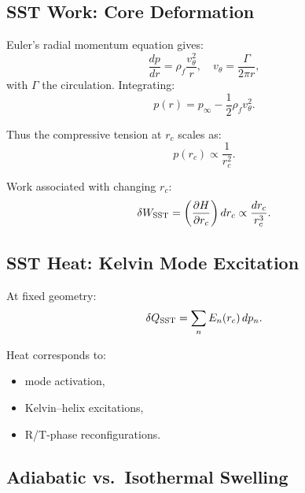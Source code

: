 \documentclass[11pt]{article}
\newcommand{\rhof}{\rho_{\!f}} \newcommand{\rhoF}{\rho_{\!f}}                             %
\newcommand{\rc}{r_c}                                    %
\begin{document}
        \subsection{SST Work: Core Deformation}

            Euler’s radial momentum equation gives:
            \begin{equation}
                \frac{dp}{dr} = \rhof \frac{v_\theta^2}{r},
                \quad
                v_\theta = \frac{\Gamma}{2\pi r},
            \end{equation}
            with $\Gamma$ the circulation.
            Integrating:
            \begin{equation}
                p(r) = p_\infty - \frac12 \rhof v_\theta^2.
            \end{equation}

            Thus the compressive tension at $\rc$ scales as:
            \begin{equation}
                p(\rc) \propto \frac{1}{\rc^2}.
            \end{equation}

            Work associated with changing $\rc$:
            \begin{equation}
                \delta W_{\rm SST} = \left( \frac{\partial H}{\partial \rc} \right) d\rc
                \propto \frac{d\rc}{\rc^3}.
            \end{equation}

        \subsection{SST Heat: Kelvin Mode Excitation}

            At fixed geometry:
            \begin{equation}
                \delta Q_{\rm SST} = \sum_n E_n(\rc)\, dp_n.
            \end{equation}

            Heat corresponds to:
            \begin{itemize}
                \item mode activation,
                \item Kelvin--helix excitations,
                \item R/T-phase reconfigurations.
            \end{itemize}

        \subsection{Adiabatic vs.\ Isothermal Swelling}
\end{document}
